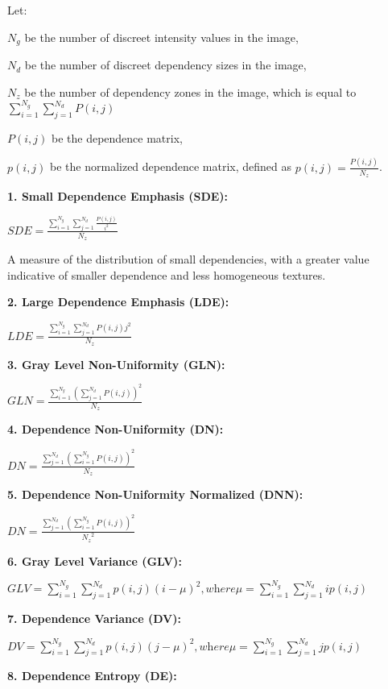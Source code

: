 Let:

 $N_{g}$ be the number of discreet intensity values in the image, 

 $N_{d}$ be the number of discreet dependency sizes in the image,

   $N_{z}$ be the number of dependency zones in the image, which is equal to $\sum _{i=1}^{N_{g}}\sum _{j=1}^{N_{d}}P\left(i,j\right)$

$P\left(i,j\right)$ be the dependence matrix,

$p\left(i,j\right)$ be the normalized dependence matrix, defined as $p\left(i,j\right)=\frac{P\left(i,j\right)}{N_{z}}$.

\textbf{1. Small Dependence Emphasis (SDE):}

$SDE=\frac{\sum _{i=1}^{N_{g}}\sum _{j=1}^{N_{d}}\frac{P\left(i,j\right)}{i^{2}}}{N_{z}}$

A measure of the distribution of small dependencies, with a greater value indicative of smaller dependence and less homogeneous textures.

\textbf{2. Large Dependence Emphasis (LDE):}

$LDE=\frac{\sum _{i=1}^{N_{g}}\sum _{j=1}^{N_{d}}P\left(i,j\right)j^{2}}{N_{z}}$

\textbf{3. Gray Level Non-Uniformity (GLN):}

$GLN=\frac{\sum _{i=1}^{N_{g}}\left(\sum _{j=1}^{N_{d}}P\left(i,j\right)\right)^{2}}{N_{z}}$

\textbf{4. Dependence Non-Uniformity (DN):}

$DN=\frac{\sum _{j=1}^{N_{d}}\left(\sum _{i=1}^{N_{g}}P\left(i,j\right)\right)^{2}}{N_{z}}$

\textbf{5. Dependence Non-Uniformity Normalized (DNN):}

$DN=\frac{\sum _{j=1}^{N_{d}}\left(\sum _{i=1}^{N_{g}}P\left(i,j\right)\right)^{2}}{{N_{z}}^{2}}$

\textbf{6. Gray Level Variance (GLV):}

$GLV=\sum _{i=1}^{N_{g}}\sum _{j=1}^{N_{d}}p\left(i,j\right)\left(i-\mu \right)^{2},\textit{where}\mu =\sum _{i=1}^{N_{g}}\sum _{j=1}^{N_{d}}ip\left(i,j\right)$

\textbf{7. Dependence Variance (DV):}

$DV=\sum _{i=1}^{N_{g}}\sum _{j=1}^{N_{d}}p\left(i,j\right)\left(j-\mu \right)^{2},\textit{where}\mu =\sum _{i=1}^{N_{g}}\sum _{j=1}^{N_{d}}jp\left(i,j\right)$

\textbf{8. Dependence Entropy (DE):}

